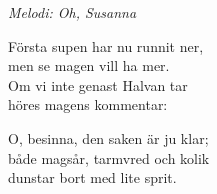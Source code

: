 {\footnotesize\textit{Melodi: Oh, Susanna}}\par
\vspace{10pt}
Första supen har nu runnit ner,\\
men se magen vill ha mer.\\
Om vi inte genast Halvan tar\\
höres magens kommentar:\par
\vspace{10pt}
O, besinna, den saken är ju klar;\\
både magsår, tarmvred och kolik\\
dunstar bort med lite sprit.
